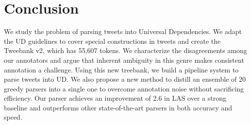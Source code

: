 \documentclass[11pt,a4paper]{article}
\begin{document}

\section{Conclusion}
We study the problem of parsing tweets into Universal Dependencies.
We adapt the UD guidelines to cover 
special constructions in tweets and create
the {\sc Tweebank v2}, which has 55,607 tokens. We characterize the disagreements
among our annotators and argue that inherent ambiguity in this genre
makes
consistent annotation a challenge.  Using this new treebank,
we build a pipeline system to parse tweets into UD. We also 
propose a new method to distill an ensemble of 20 greedy parsers into a single one
to overcome annotation noise without sacrificing efficiency.
Our parser achieves an improvement of 2.6  in LAS over a strong baseline
and outperforms other state-of-the-art parsers in both accuracy and speed.



\end{document}
